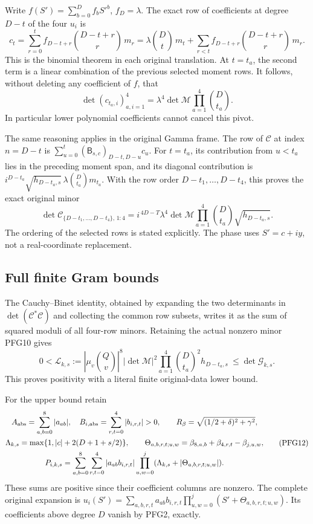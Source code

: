 \documentclass[10pt]{article}
\begin{document}
Write $f(S')=\sum_{b=0}^Df_bS'^b$, $f_D=\lambda$.
The exact row of coefficients at degree $D-t$ of the four $u_i$
is
\[
 c_t=\sum_{r=0}^t
       f_{D-t+r}\binom{D-t+r}{r}\,m_r
   =\lambda\binom Dt\,m_t+
             \sum_{r<t}f_{D-t+r}\binom{D-t+r}{r}\,m_r .
 \tag{PFG8}
\]
This is the binomial theorem in each original translation.
At $t=t_a$, the second term is a linear combination of the
previous selected moment rows. It follows, without deleting
any coefficient of $f$, that
\[
 \det(c_{t_a,i})_{a,i=1}^4
       =\lambda^4\det\mathcal M\prod_{a=1}^4\binom D{t_a}.
 \tag{PFG9}
\]
In particular lower polynomial coefficients cannot cancel this pivot.

The same reasoning applies in the original Gamma frame.
The row of $\mathcal C$ at index $n=D-t$ is
$\sum_{u=0}^t(\mathsf B_{s,c})_{D-t,D-u}c_u$.
For $t=t_a$, its contribution from $u<t_a$ lies in the preceding
moment span, and its diagonal contribution is
$i^{D-t_a}\sqrt{h_{D-t_a,s}}\,\lambda\binom D{t_a}m_{t_a}$.
With the row order $D-t_1,\ldots,D-t_4$, this proves the exact
original minor
\[
 \boxed{\quad
 \det\mathcal C_{\{D-t_1,\ldots,D-t_4\},\,1:4}
 =i^{\,4D-T}\lambda^4\det\mathcal M
       \prod_{a=1}^4\binom D{t_a}\sqrt{h_{D-t_a,s}} .
 \quad}\tag{PFG10}
\]
The ordering of the selected rows is stated explicitly.
The phase uses $S'=c+iy$, not a real-coordinate replacement.

\subsection{Full finite Gram bounds}

The Cauchy--Binet identity, obtained by expanding the two determinants
in $\det(\mathcal C^*\mathcal C)$ and collecting the common row
subsets, writes it as the sum of squared moduli of all four-row
minors. Retaining the actual nonzero minor PFG10 gives
\[
 0<\mathcal L_{k,s}:=
 |\mu_v\binom Qv|^8|\det\mathcal M|^2
       \prod_{a=1}^4\binom D{t_a}^{\!2}h_{D-t_a,s}
 \ \le\det\mathcal G_{k,s}.
 \tag{PFG11}
\]
This proves positivity with a literal finite original-data lower bound.

For the upper bound retain
\[
\begin{gathered}
 A_{\rm abs}=\sum_{a,b=0}^8|a_{ab}|,\quad
 B_{i,\rm abs}=\sum_{r,t=0}^4|b_{i,r,t}|>0,\qquad
 R_\beta=\sqrt{(1/2+\delta)^2+\gamma^2},\\
 \Lambda_{k,s}=\max\{1,|c|+2(D+1+s/2)\},\qquad
 \Theta_{a,b,r,t;u,w}
     =\beta_{8,a,b}+\beta_{4,r,t}-\beta_{j,u,w},\\
 P_{i,k,s}=\sum_{a,b=0}^8\sum_{r,t=0}^4|a_{ab}b_{i,r,t}|
            \prod_{u,w=0}^j
               (\Lambda_{k,s}+|\Theta_{a,b,r,t;u,w}|).
\end{gathered}\tag{PFG12}
\]
These sums are positive since their coefficient columns are nonzero.
The complete original expansion is
$u_i(S')=\sum_{a,b,r,t}a_{ab}b_{i,r,t}
\prod_{u,w=0}^j(S'+\Theta_{a,b,r,t;u,w})$.
Its coefficients above degree $D$ vanish by PFG2, exactly.
\end{document}
